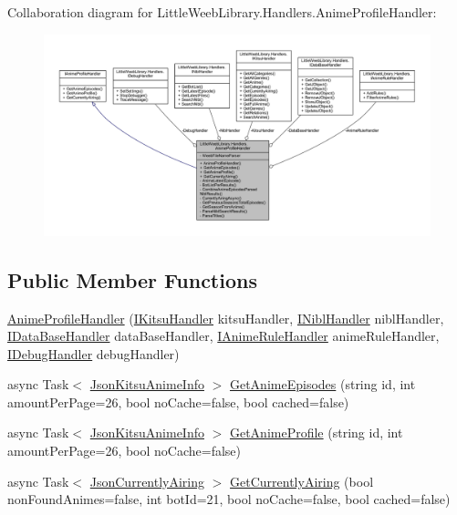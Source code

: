 Collaboration diagram for Little\+Weeb\+Library.\+Handlers.\+Anime\+Profile\+Handler\+:\nopagebreak
\begin{figure}[H]
\begin{center}
\leavevmode
\includegraphics[width=350pt]{class_little_weeb_library_1_1_handlers_1_1_anime_profile_handler__coll__graph}
\end{center}
\end{figure}
\subsection*{Public Member Functions}
\begin{DoxyCompactItemize}
\item 
\mbox{\hyperlink{class_little_weeb_library_1_1_handlers_1_1_anime_profile_handler_ac2f5e6adc1c0a36ff24797a437bf490d}{Anime\+Profile\+Handler}} (\mbox{\hyperlink{interface_little_weeb_library_1_1_handlers_1_1_i_kitsu_handler}{I\+Kitsu\+Handler}} kitsu\+Handler, \mbox{\hyperlink{interface_little_weeb_library_1_1_handlers_1_1_i_nibl_handler}{I\+Nibl\+Handler}} nibl\+Handler, \mbox{\hyperlink{interface_little_weeb_library_1_1_handlers_1_1_i_data_base_handler}{I\+Data\+Base\+Handler}} data\+Base\+Handler, \mbox{\hyperlink{interface_little_weeb_library_1_1_handlers_1_1_i_anime_rule_handler}{I\+Anime\+Rule\+Handler}} anime\+Rule\+Handler, \mbox{\hyperlink{interface_little_weeb_library_1_1_handlers_1_1_i_debug_handler}{I\+Debug\+Handler}} debug\+Handler)
\item 
async Task$<$ \mbox{\hyperlink{class_little_weeb_library_1_1_models_1_1_json_kitsu_anime_info}{Json\+Kitsu\+Anime\+Info}} $>$ \mbox{\hyperlink{class_little_weeb_library_1_1_handlers_1_1_anime_profile_handler_a5b163eb7e68b1e40904fa55454d8ba54}{Get\+Anime\+Episodes}} (string id, int amount\+Per\+Page=26, bool no\+Cache=false, bool cached=false)
\item 
async Task$<$ \mbox{\hyperlink{class_little_weeb_library_1_1_models_1_1_json_kitsu_anime_info}{Json\+Kitsu\+Anime\+Info}} $>$ \mbox{\hyperlink{class_little_weeb_library_1_1_handlers_1_1_anime_profile_handler_aaa89fba506cfcdad18a5aa3f9b860061}{Get\+Anime\+Profile}} (string id, int amount\+Per\+Page=26, bool no\+Cache=false)
\item 
async Task$<$ \mbox{\hyperlink{class_little_weeb_library_1_1_models_1_1_json_currently_airing}{Json\+Currently\+Airing}} $>$ \mbox{\hyperlink{class_little_weeb_library_1_1_handlers_1_1_anime_profile_handler_a7469a40799e1067d871ba87679f54c37}{Get\+Currently\+Airing}} (bool non\+Found\+Animes=false, int bot\+Id=21, bool no\+Cache=false, bool cached=false)
\end{DoxyCompactItemize}
